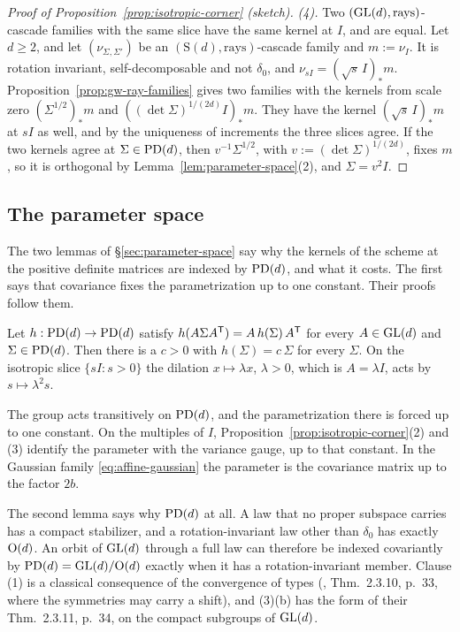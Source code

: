 \begin{proof}[Proof of Proposition~\ref{prop:isotropic-corner} (sketch)]
\emph{(4).} Two $(\mathrm{GL}(d), \text{rays})$-cascade families with the same slice have the same kernel
at $I$, and are equal. Let $d \ge 2$, and let $(\nu_{\Sigma,\Sigma'})$ be an
$(\mathrm S(d), \text{rays})$-cascade family and $m := \nu_I$. It is rotation invariant,
self-decomposable and not $\delta_0$, and $\nu_{sI} = (\sqrt s\,I)_*m$. Proposition~\ref{prop:gw-ray-families}
gives two families with the kernels from scale zero $(\Sigma^{1/2})_*m$ and
$((\det\Sigma)^{1/(2d)}I)_*m$. They have the kernel $(\sqrt s\,I)_*m$ at $sI$ as well, and by the
uniqueness of increments the three slices agree. If the two kernels agree at $\Sigma \in \mathrm{PD}(d)$,
then $v^{-1}\Sigma^{1/2}$, with $v := (\det\Sigma)^{1/(2d)}$, fixes $m$, so it is orthogonal by
Lemma~\ref{lem:parameter-space}(2), and $\Sigma = v^2I$.
\end{proof}

\subsection{The parameter space}

The two lemmas of \S\ref{sec:parameter-space} say why the kernels of the scheme at the positive
definite matrices are indexed by $\mathrm{PD}(d)$, and what it costs. The first says that covariance fixes the
parametrization up to one constant. Their proofs follow them.

\begin{lemma}\label{lem:affine-gauge}
Let $h : \mathrm{PD}(d) \to \mathrm{PD}(d)$ satisfy $h(A\Sigma A^{\mathsf{T}}) = A\,h(\Sigma)\,A^{\mathsf{T}}$ for every
$A \in \mathrm{GL}(d)$ and $\Sigma \in \mathrm{PD}(d)$. Then there is a $c > 0$ with $h(\Sigma) = c\,\Sigma$ for
every $\Sigma$. On the isotropic slice $\{sI : s > 0\}$ the dilation $x \mapsto \lambda x$,
$\lambda > 0$, which is $A = \lambda I$, acts by $s \mapsto \lambda^2 s$.
\end{lemma}

The group acts transitively on $\mathrm{PD}(d)$, and the parametrization there is forced up to one
constant. On the multiples of $I$, Proposition~\ref{prop:isotropic-corner}(2) and (3) identify
the parameter with the variance gauge, up to that constant. In the Gaussian family
\ref{eq:affine-gaussian} the parameter is the covariance matrix up to the factor $2b$.

The second lemma says why $\mathrm{PD}(d)$ at all. A law that no proper subspace carries has a compact
stabilizer, and a rotation-invariant law other than $\delta_0$ has exactly $\mathrm{O}(d)$. An orbit of
$\mathrm{GL}(d)$ through a full law can therefore be indexed covariantly by $\mathrm{PD}(d) = \mathrm{GL}(d)/\mathrm{O}(d)$
exactly when it
has a rotation-invariant member.
Clause (1) is a classical consequence of the convergence of types (,
Thm.~2.3.10, p.~33, where the symmetries may carry a shift), and (3)(b) has the form of their
Thm.~2.3.11, p.~34, on the compact subgroups of $\mathrm{GL}(d)$.

